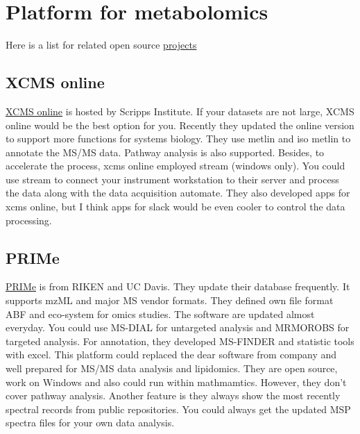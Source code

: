 \documentclass[
]{book}
\begin{document}
\hypertarget{platform-for-metabolomics}{%
\section{Platform for metabolomics}\label{platform-for-metabolomics}}

Here is a list for related open source \href{http://strimmerlab.org/notes/mass-spectrometry.html}{projects}

\hypertarget{xcms-online}{%
\subsection{XCMS online}\label{xcms-online}}

\href{https://xcmsonline.scripps.edu/landing_page.php?pgcontent=mainPage}{XCMS online} is hosted by Scripps Institute. If your datasets are not large, XCMS online would be the best option for you. Recently they updated the online version to support more functions for systems biology. They use metlin and iso metlin to annotate the MS/MS data. Pathway analysis is also supported. Besides, to accelerate the process, xcms online employed stream (windows only). You could use stream to connect your instrument workstation to their server and process the data along with the data acquisition automate. They also developed apps for xcms online, but I think apps for slack would be even cooler to control the data processing.

\hypertarget{prime}{%
\subsection{PRIMe}\label{prime}}

\href{http://prime.psc.riken.jp/Metabolomics_Software/}{PRIMe} is from RIKEN and UC Davis. They update their database frequently\citep{tsugawa2016}. It supports mzML and major MS vendor formats. They defined own file format ABF and eco-system for omics studies. The software are updated almost everyday. You could use MS-DIAL for untargeted analysis and MRMOROBS for targeted analysis. For annotation, they developed MS-FINDER and statistic tools with excel. This platform could replaced the dear software from company and well prepared for MS/MS data analysis and lipidomics. They are open source, work on Windows and also could run within mathmamtics. However, they don't cover pathway analysis. Another feature is they always show the most recently spectral records from public repositories. You could always get the updated MSP spectra files for your own data analysis.
\end{document}
